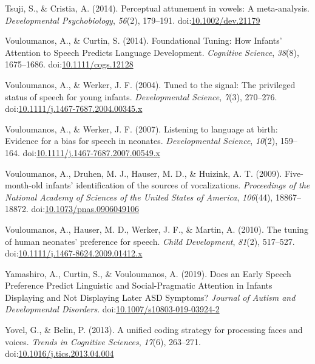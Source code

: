\documentclass[man]{apa6}
\begin{document}
\hypertarget{ref-tsuji_perceptual_2014}{}
Tsuji, S., \& Cristia, A. (2014). Perceptual attunement in vowels: A
meta-analysis. \emph{Developmental Psychobiology}, \emph{56}(2),
179--191.
doi:\href{https://doi.org/10.1002/dev.21179}{10.1002/dev.21179}

\hypertarget{ref-vouloumanos_foundational_2014}{}
Vouloumanos, A., \& Curtin, S. (2014). Foundational Tuning: How Infants'
Attention to Speech Predicts Language Development. \emph{Cognitive
Science}, \emph{38}(8), 1675--1686.
doi:\href{https://doi.org/10.1111/cogs.12128}{10.1111/cogs.12128}

\hypertarget{ref-vouloumanos_tuned_2004}{}
Vouloumanos, A., \& Werker, J. F. (2004). Tuned to the signal: The
privileged status of speech for young infants. \emph{Developmental
Science}, \emph{7}(3), 270--276.
doi:\href{https://doi.org/10.1111/j.1467-7687.2004.00345.x}{10.1111/j.1467-7687.2004.00345.x}

\hypertarget{ref-vouloumanos_listening_2007}{}
Vouloumanos, A., \& Werker, J. F. (2007). Listening to language at
birth: Evidence for a bias for speech in neonates. \emph{Developmental
Science}, \emph{10}(2), 159--164.
doi:\href{https://doi.org/10.1111/j.1467-7687.2007.00549.x}{10.1111/j.1467-7687.2007.00549.x}

\hypertarget{ref-vouloumanos_five-month-old_2009}{}
Vouloumanos, A., Druhen, M. J., Hauser, M. D., \& Huizink, A. T. (2009).
Five-month-old infants' identification of the sources of vocalizations.
\emph{Proceedings of the National Academy of Sciences of the United
States of America}, \emph{106}(44), 18867--18872.
doi:\href{https://doi.org/10.1073/pnas.0906049106}{10.1073/pnas.0906049106}

\hypertarget{ref-vouloumanos_tuning_2010}{}
Vouloumanos, A., Hauser, M. D., Werker, J. F., \& Martin, A. (2010). The
tuning of human neonates' preference for speech. \emph{Child
Development}, \emph{81}(2), 517--527.
doi:\href{https://doi.org/10.1111/j.1467-8624.2009.01412.x}{10.1111/j.1467-8624.2009.01412.x}

\hypertarget{ref-yamashiro_does_2019}{}
Yamashiro, A., Curtin, S., \& Vouloumanos, A. (2019). Does an Early
Speech Preference Predict Linguistic and Social-Pragmatic Attention in
Infants Displaying and Not Displaying Later ASD Symptoms? \emph{Journal
of Autism and Developmental Disorders}.
doi:\href{https://doi.org/10.1007/s10803-019-03924-2}{10.1007/s10803-019-03924-2}

\hypertarget{ref-yovel_unified_2013}{}
Yovel, G., \& Belin, P. (2013). A unified coding strategy for processing
faces and voices. \emph{Trends in Cognitive Sciences}, \emph{17}(6),
263--271.
doi:\href{https://doi.org/10.1016/j.tics.2013.04.004}{10.1016/j.tics.2013.04.004}

\endgroup
\end{document}

